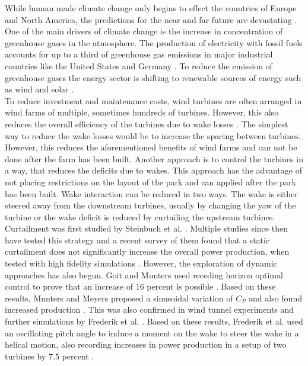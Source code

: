 While human made climate change only begins to effect the countries of Europe and North America, the predictions for the near and far future are devastating \cite{hoegh-guldberg_impacts_2019}. One of the main drivers of climate change is the increase in concentration of greenhouse gases in the atmosphere. The production of electricity with fossil fuels accounts for up to a third of greenhouse gas emissions in major industrial countries like the United States \cite{hockstad_inventory_2018} and Germany \cite{ortl_entwicklung_2020}. To reduce the emission of greenhouse gases the energy sector is shifting to renewable sources of energy such as wind and solar \cite{international_energy_agency_global_2020}.\\
To reduce investment and maintenance costs, wind turbines are often arranged in wind farms of multiple, sometimes hundreds of turbines. However, this also reduces the overall efficiency of the turbines due to wake losses \cite{nilsson_large-eddy_2015}. The simplest way to reduce the wake losses would be to increase the spacing between turbines. However, this reduces the aforementioned benefits of wind farms and can not be done after the farm has been built. Another approach is to control the turbines in a way, that reduces the deficits due to wakes. This approach has the advantage of not placing restrictions on the layout of the park and can applied after the park has been built. Wake interaction can be reduced in two ways. The wake is either steered away from the downstream turbines, usually by changing the yaw of the turbine or the wake deficit is reduced by curtailing the upstream turbines. Curtailment was first studied by Steinbuch et al. \cite{steinbuch_optimal_1988}. Multiple studies since then have tested this strategy and a recent survey of them found that a static curtailment does not significantly increase the overall power production, when tested with high fidelity simulations \cite{kheirabadi_quantitative_2019}. However, the exploration of dynamic approaches has also begun. Goit and Munters used receding horizon optimal control to prove that an increase of $16$ percent is possible \cite{goit_optimal_2015}. Based on these results, Munters and Meyers proposed a sinusoidal variation of $C_P$ and also found increased production \cite{munters_towards_2018}. This was also confirmed in wind tunnel experiments and further simulations by Frederik et al. \cite{frederik_periodic_2020}. Based on these results, Frederik et al. used an oscillating pitch angle to induce a moment on the wake to steer the wake in a helical motion, also recording increases in power production in a setup of two turbines by $7.5$ percent \cite{frederik_helix_2020}. \\
